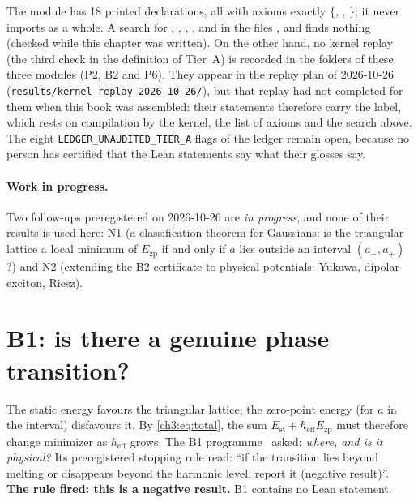 \begin{warnbox}
The module  has 18 printed declarations, all with axioms exactly
$\{$, , $\}$; it never imports  as a whole.
A search for , , , ,  and
 in the files ,  and
 finds nothing (checked while this chapter was written). On the other hand, no
 kernel replay (the third check in the definition of Tier~A) is recorded in the folders of these three
modules (P2, B2 and P6). They appear in the replay plan of 2026-10-26 (\texttt{results/kernel\_replay\_2026-10-26/}),
but that replay had not completed for them when this book was assembled: their statements therefore carry the \tierAs{}
label, which rests on compilation by the kernel, the list of axioms and the search above. The eight
\texttt{LEDGER\_UNAUDITED\_TIER\_A} flags of the ledger remain open, because no
person has certified that the Lean statements say what their glosses say.
\end{warnbox}

\paragraph{Work in progress.} Two follow-ups preregistered on 2026-10-26 are \emph{in progress}, and none of their
results is used here: N1 (a classification theorem for Gaussians: is the triangular lattice a local minimum of
$E_{\mathrm{zp}}$ if and only if $a$ lies outside an interval $(a_-,a_+)$?) and N2 (extending the B2 certificate to
physical potentials: Yukawa, dipolar exciton, Riesz).

\section{B1: is there a genuine phase transition?}\label{ch3:sec:transition}
The static energy favours the triangular lattice; the zero-point energy (for $a$ in the interval) disfavours it. By
\eqref{ch3:eq:total}, the sum $E_{\mathrm{st}}+\hbar_{\mathrm{eff}}E_{\mathrm{zp}}$ must therefore change minimizer
as $\hbar_{\mathrm{eff}}$ grows. The B1 programme~\cite{ch3-b1} asked: \emph{where, and is it physical?} Its
preregistered stopping rule read: ``if the transition lies beyond melting or disappears beyond the harmonic level,
report it (negative result)''. \textbf{The rule fired: this is a negative result.} B1 contains no
Lean statement.


